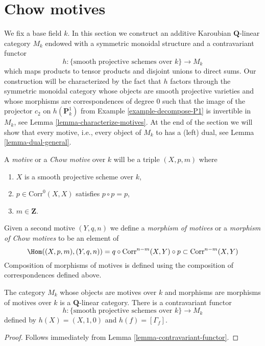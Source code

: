 \section{Chow motives}
\label{section-chow-motives}

\noindent
We fix a base field $k$. In this section we construct an additive
Karoubian $\mathbf{Q}$-linear category $M_k$ endowed
with a symmetric monoidal structure and a contravariant functor
$$
h : \{\text{smooth projective schemes over }k\} \longrightarrow M_k
$$
which maps products to tensor products and disjoint unions to direct sums.
Our construction will be characterized by the fact that $h$ factors through
the symmetric monoidal category whose objects are smooth projective varieties
and whose morphisms are correspondences of degree $0$ such that
the image of the projector $c_2$ on $h(\mathbf{P}^1_k)$ from
Example \ref{example-decompose-P1} is invertible in $M_k$, see
Lemma \ref{lemma-characterize-motives}.
At the end of the section we will show that every motive, i.e.,
every object of $M_k$ to has a (left) dual, see Lemma \ref{lemma-dual-general}.

\medskip\noindent
A {\it motive} or a {\it Chow motive} over $k$ will be a triple
$(X, p, m)$ where
\begin{enumerate}
\item $X$ is a smooth projective scheme over $k$,
\item $p \in \text{Corr}^0(X, X)$ satisfies $p \circ p = p$,
\item $m \in \mathbf{Z}$.
\end{enumerate}
Given a second motive $(Y, q, n)$ we define a
{\it morphism of motives} or a {\it morphism of Chow motives}
to be an element of
$$
\Hom((X, p, m), (Y, q, n)) =
q \circ \text{Corr}^{n - m}(X, Y) \circ p \subset \text{Corr}^{n - m}(X, Y)
$$
Composition of morphisms of motives is defined using the composition of
correspondences defined above.

\begin{lemma}
\label{lemma-motives}
The category $M_k$ whose objects are motives over $k$ and morphisms
are morphisms of motives over $k$ is a $\mathbf{Q}$-linear category.
There is a contravariant functor
$$
h : \{\text{smooth projective schemes over }k\} \longrightarrow M_k
$$
defined by $h(X) = (X, 1, 0)$ and $h(f) = [\Gamma_f]$.
\end{lemma}

\begin{proof}
Follows immediately from Lemma \ref{lemma-contravariant-functor}.
\end{proof}

